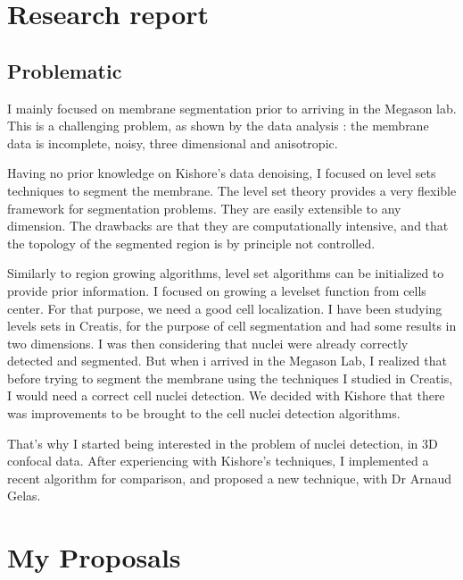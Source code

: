 

\chapter{Research report} 


\section{Problematic}


I mainly focused on membrane segmentation prior to arriving in the Megason lab. This is a challenging problem, as shown by the data analysis : the membrane data is incomplete, noisy, three dimensional and anisotropic.

Having no prior knowledge on Kishore's data denoising, I focused on level sets techniques to segment the membrane.
The level set theory provides a very flexible framework for segmentation problems. They are easily extensible to any dimension.
The drawbacks are that they are computationally intensive, and that the topology of the segmented region is by principle not controlled.

Similarly to region growing algorithms, level set algorithms can be initialized to provide prior information.
I focused on growing a levelset function from cells center. For that purpose, we need a good cell localization.
I have been studying levels sets in Creatis, for the purpose of cell segmentation and had some results in two dimensions.
I was then considering that nuclei were already correctly detected and segmented.
But when i arrived in the Megason Lab, I realized that before trying to segment the membrane using the techniques I studied in Creatis, I would need a correct cell nuclei detection.
We decided with Kishore that there was improvements to be brought to the cell nuclei detection algorithms.

That's why I started being interested in the problem of nuclei detection, in 3D confocal data.
After experiencing with Kishore's techniques, I implemented a recent algorithm for comparison, and proposed a new technique, with Dr Arnaud Gelas.


\chapter{My Proposals}

